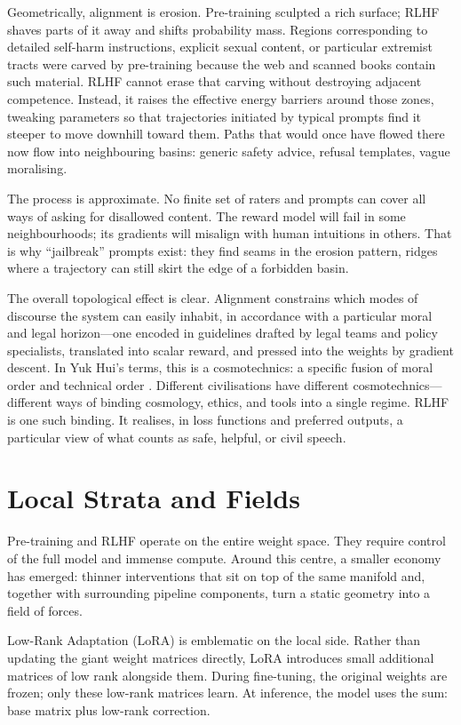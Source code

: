 \documentclass[12pt,a4paper]{article}
\begin{document}
Geometrically, alignment is erosion. Pre-training sculpted a rich surface; RLHF shaves parts of it away and shifts probability mass. Regions corresponding to detailed self-harm instructions, explicit sexual content, or particular extremist tracts were carved by pre-training because the web and scanned books contain such material. RLHF cannot erase that carving without destroying adjacent competence. Instead, it raises the effective energy barriers around those zones, tweaking parameters so that trajectories initiated by typical prompts find it steeper to move downhill toward them. Paths that would once have flowed there now flow into neighbouring basins: generic safety advice, refusal templates, vague moralising.

The process is approximate. No finite set of raters and prompts can cover all ways of asking for disallowed content. The reward model will fail in some neighbourhoods; its gradients will misalign with human intuitions in others. That is why ``jailbreak'' prompts exist: they find seams in the erosion pattern, ridges where a trajectory can still skirt the edge of a forbidden basin.

The overall topological effect is clear. Alignment constrains which modes of discourse the system can easily inhabit, in accordance with a particular moral and legal horizon---one encoded in guidelines drafted by legal teams and policy specialists, translated into scalar reward, and pressed into the weights by gradient descent. In Yuk Hui's terms, this is a cosmotechnics: a specific fusion of moral order and technical order \cite{hui2016question,hui2020cosmotechnics}. Different civilisations have different cosmotechnics---different ways of binding cosmology, ethics, and tools into a single regime. RLHF is one such binding. It realises, in loss functions and preferred outputs, a particular view of what counts as safe, helpful, or civil speech.

\section{Local Strata and Fields}

Pre-training and RLHF operate on the entire weight space. They require control of the full model and immense compute. Around this centre, a smaller economy has emerged: thinner interventions that sit on top of the same manifold and, together with surrounding pipeline components, turn a static geometry into a field of forces.

Low-Rank Adaptation (LoRA) is emblematic on the local side. Rather than updating the giant weight matrices directly, LoRA introduces small additional matrices of low rank alongside them. During fine-tuning, the original weights are frozen; only these low-rank matrices learn. At inference, the model uses the sum: base matrix plus low-rank correction.
\end{document}
